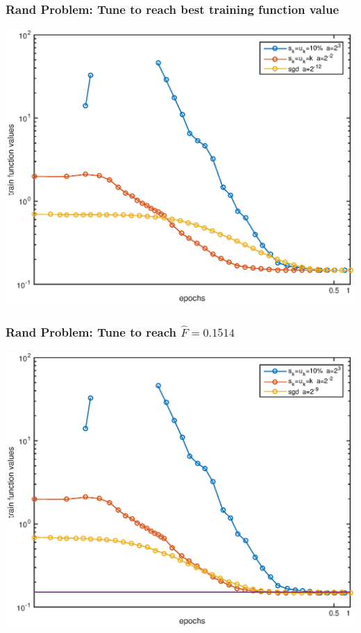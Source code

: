 \documentclass{beamer}
\begin{document}
 
		\begin{frame}
			\frametitle{Rand Problem: Tune to reach best training function value}
			\begin{center}
					\includegraphics[scale=0.5]{whowins1.eps}
			\end{center}
     	\end{frame}

\begin{frame}
	        \frametitle{Rand Problem: Tune to reach $\hat{F}=0.1514$}
	\begin{center}
			\includegraphics[scale=0.5]{whowins2-1.eps}
	\end{center}
\end{frame}
\end{document}
